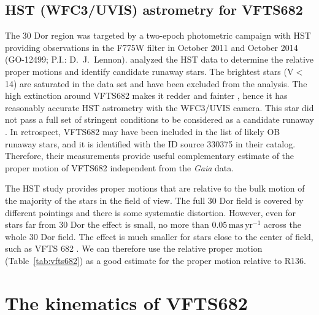 \documentclass[a4paper,fleqn,usenatbib]{mnras}
\newcommand{\masyr}{\,\mathrm{mas}\,\mathrm{yr}^{-1}}
\DeclareRobustCommand{\Tabref}[1]{Table~\ref{#1}}
\begin{document}
\subsection{HST (WFC3/UVIS) astrometry for VFTS682}

The 30 Dor region was targeted by a two-epoch photometric campaign
with HST providing observations in the F775W filter in October 2011
and October 2014 (GO-12499; P.I.: D.~J.~Lennon). 
\citet{platais:15, platais:18} analyzed the HST data to determine the
relative proper motions and identify candidate runaway stars. The
brightest stars (V$<$14) are saturated in the data set and have been
excluded from the analysis. The high extinction around VFTS682
makes it redder and fainter \citep[$V=16.08$,
$B-V=0.58$,][]{evans:11}, hence it has reasonably accurate HST astrometry
with the WFC3/UVIS camera. This star did not pass a full set of stringent
conditions to be considered as a candidate runaway \citep[][]{platais:18}.
In retrospect, VFTS682 may have been included in the list of likely
OB runaway stars, and it is identified
with the ID source 330375 in their catalog. 
Therefore, their measurements provide useful
complementary estimate of the proper motion of VFTS682 independent from the \emph{Gaia} data. 
 
The HST study provides proper motions that are relative to the bulk motion
of the majority of the stars in the field of view. The full 30 Dor
field is covered by different pointings and there is some systematic
distortion.  However, even for stars far from 30 Dor the effect is
small, no more than $0.05\masyr$ across the whole 30 Dor field. The
effect is much smaller for stars close to the center of field, such as
VFTS 682 \citep{platais:18}.  We can therefore use the relative proper
motion (\Tabref{tab:vfts682}) as a good estimate for the proper motion relative to R136. 
 

\section{The kinematics of VFTS682}
\label{sec:results}
\end{document}
